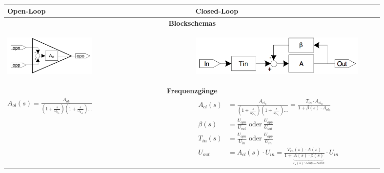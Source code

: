 \begin{tabular}{|p{0.45\linewidth}|p{0.45\linewidth}|}
	\hline
	\textbf{Open-Loop}
		& \textbf{Closed-Loop}\\
	\hline
	\multicolumn{2}{|c|}{\textbf{Blockschemas}}\\
	\hline
    \vspace{-7mm}
	\begin{center}
	 	\includegraphics[height=2cm, valign=t]{./pictures/opAmpOL.png}
	\end{center}
		& \vspace{-7mm}
          \begin{center}
			\includegraphics[height=2cm, valign=t]{./pictures/opAmpCL.png}
		  \end{center}\\
	\hline
	\multicolumn{2}{|c|}{\textbf{Frequenzgänge}}\\
	\hline
	\large{$A_{ol}(s)=\frac{A_{ol_0}}{(1+\frac{s}{\omega_{p_{ol_1}}})(1+\frac{s}{\omega_{p_{ol_2}}})\dots}$}
	& $\begin{aligned}
        A_{cl}(s) &= \frac{A_{cl_0}}{(1+\frac{s}{\omega_{p_{cl_1}}})(1+\frac{s}{\omega_{p_{cl_2}}})\dots} = \frac{T_{in}\cdot A_{ol_0}}{1+\beta(s)\cdot A_{ol_0}}\\
		\beta(s) &= \frac{U_{opn}}{U_{out}}\;\text{oder}\;\frac{U_{opp}}{U_{out}}\\
		T_{in}(s) &= \frac{U_{opn}}{U_{in}}\;\text{oder}\;\frac{U_{opp}}{U_{in}}\\
        U_{out} &= A_{cl}(s)\cdot U_{in} = \frac{T_{in}(s)\cdot A(s)}{1 + \underbrace{A(s)\cdot \beta(s)}_{T_s(s):Loop-Gain}} \cdot U_{in}
	   \end{aligned}$\\
	\hline
\end{tabular}
\\ \\
